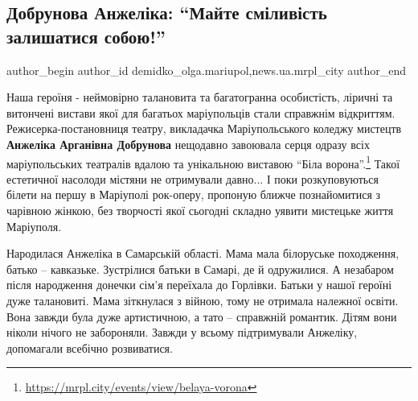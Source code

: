  
 
 
 
 
 
\subsection{Добрунова Анжеліка: \enquote{Майте сміливість залишатися собою!}}
\label{sec:12_11_2019.stz.news.ua.mrpl_city.1.dobrunova_anzhelika_smilyvist_zalyshatys_soboju}
 
\ifcmt
 author_begin
   author_id demidko_olga.mariupol,news.ua.mrpl_city
 author_end
\fi


Наша героїня - неймовірно талановита та багатогранна особистість, ліричні та
витончені вистави якої для багатьох маріупольців стали справжнім відкриттям.
Режисерка-постановниця театру, викладачка Маріупольського коледжу мистецтв
\textbf{Анжеліка Арганівна Добрунова} нещодавно завоювала серця одразу всіх
маріупольських театралів вдалою та унікальною виставою \enquote{Біла
ворона}.\footnote{\url{https://mrpl.city/events/view/belaya-vorona}} Такої
естетичної насолоди містяни не отримували давно... І поки розкуповуються білети
на першу в Маріуполі рок-оперу, пропоную ближче познайомитися з чарівною
жінкою, без творчості якої сьогодні складно уявити мистецьке життя Маріуполя.

Народилася Анжеліка в Самарській області. Мама мала білоруське походження,
батько – кавказьке. Зустрілися батьки в Самарі, де й одружилися. А незабаром
після народження донечки сім'я переїхала до Горлівки. Батьки у нашої героїні
дуже талановиті. Мама зіткнулася з війною, тому не отримала належної освіти.
Вона завжди була дуже артистичною, а тато – справжній романтик. Дітям вони
ніколи нічого не забороняли. Завжди у всьому підтримували Анжеліку, допомагали
всебічно розвиватися.

